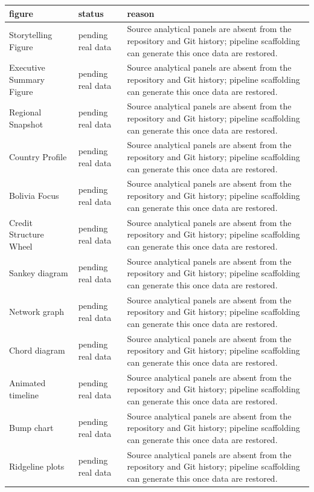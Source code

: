 ﻿%
\begin{tabular}{lll}
\hline
figure & status & reason \\
\hline
Storytelling Figure & pending real data & Source analytical panels are absent from the repository and Git history; pipeline scaffolding can generate this once data are restored. \\
Executive Summary Figure & pending real data & Source analytical panels are absent from the repository and Git history; pipeline scaffolding can generate this once data are restored. \\
Regional Snapshot & pending real data & Source analytical panels are absent from the repository and Git history; pipeline scaffolding can generate this once data are restored. \\
Country Profile & pending real data & Source analytical panels are absent from the repository and Git history; pipeline scaffolding can generate this once data are restored. \\
Bolivia Focus & pending real data & Source analytical panels are absent from the repository and Git history; pipeline scaffolding can generate this once data are restored. \\
Credit Structure Wheel & pending real data & Source analytical panels are absent from the repository and Git history; pipeline scaffolding can generate this once data are restored. \\
Sankey diagram & pending real data & Source analytical panels are absent from the repository and Git history; pipeline scaffolding can generate this once data are restored. \\
Network graph & pending real data & Source analytical panels are absent from the repository and Git history; pipeline scaffolding can generate this once data are restored. \\
Chord diagram & pending real data & Source analytical panels are absent from the repository and Git history; pipeline scaffolding can generate this once data are restored. \\
Animated timeline & pending real data & Source analytical panels are absent from the repository and Git history; pipeline scaffolding can generate this once data are restored. \\
Bump chart & pending real data & Source analytical panels are absent from the repository and Git history; pipeline scaffolding can generate this once data are restored. \\
Ridgeline plots & pending real data & Source analytical panels are absent from the repository and Git history; pipeline scaffolding can generate this once data are restored. \\

\end{tabular}
